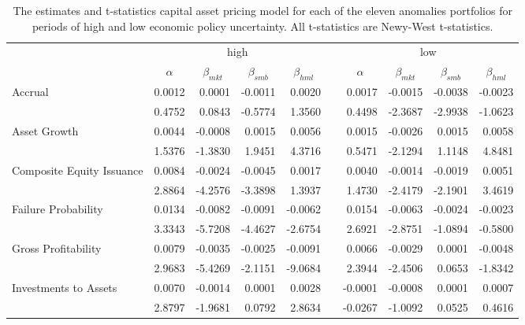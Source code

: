 \begin{table}[]
    \caption{\newline The estimates and t-statistics capital asset pricing model for each of the eleven anomalies portfolios for periods of high and low economic policy uncertainty. All t-statistics are Newy-West t-statistics.}
    \label{tab:epu-ff3}
    \begin{tabular}{@{}lrrrrlrrrr@{}}
    \toprule
    \multicolumn{1}{c}{} & \multicolumn{4}{c}{high} &  & \multicolumn{4}{c}{low} \\ \cmidrule(lr){2-5} \cmidrule(l){7-10} 
    \multicolumn{1}{c}{} & \multicolumn{1}{c}{$\alpha$} & \multicolumn{1}{c}{$\beta_{mkt}$} & \multicolumn{1}{c}{$\beta_{smb}$} & \multicolumn{1}{c}{$\beta_{hml}$} &  & \multicolumn{1}{c}{$\alpha$} & \multicolumn{1}{c}{$\beta_{mkt}$} & \multicolumn{1}{c}{$\beta_{smb}$} & \multicolumn{1}{c}{$\beta_{hml}$} \\ \midrule
    Accrual & 0.0012 & 0.0001 & -0.0011 & 0.0020 &  & 0.0017 & -0.0015 & -0.0038 & -0.0023 \\
        & 0.4752 & 0.0843 & -0.5774 & 1.3560 &  & 0.4498 & -2.3687 & -2.9938 & -1.0623 \\
    Asset Growth & 0.0044 & -0.0008 & 0.0015 & 0.0056 &  & 0.0015 & -0.0026 & 0.0015 & 0.0058 \\
        & 1.5376 & -1.3830 & 1.9451 & 4.3716 &  & 0.5471 & -2.1294 & 1.1148 & 4.8481 \\
    Composite Equity Issuance & 0.0084 & -0.0024 & -0.0045 & 0.0017 &  & 0.0040 & -0.0014 & -0.0019 & 0.0051 \\
        & 2.8864 & -4.2576 & -3.3898 & 1.3937 &  & 1.4730 & -2.4179 & -2.1901 & 3.4619 \\
    Failure Probability & 0.0134 & -0.0082 & -0.0091 & -0.0062 &  & 0.0154 & -0.0063 & -0.0024 & -0.0023 \\
        & 3.3343 & -5.7208 & -4.4627 & -2.6754 &  & 2.6921 & -2.8751 & -1.0894 & -0.5800 \\
    Gross Profitability & 0.0079 & -0.0035 & -0.0025 & -0.0091 &  & 0.0066 & -0.0029 & 0.0001 & -0.0048 \\
        & 2.9683 & -5.4269 & -2.1151 & -9.0684 &  & 2.3944 & -2.4506 & 0.0653 & -1.8342 \\
    Investments to Assets & 0.0070 & -0.0014 & 0.0001 & 0.0028 &  & -0.0001 & -0.0008 & 0.0001 & 0.0007 \\
        & 2.8797 & -1.9681 & 0.0792 & 2.8634 &  & -0.0267 & -1.0092 & 0.0525 & 0.4616 \\

\end{tabular}
\end{table}
